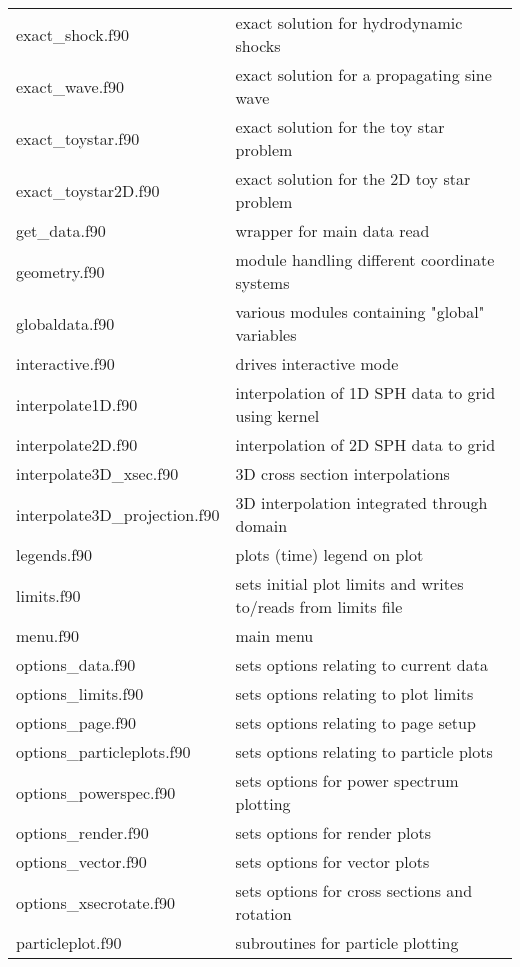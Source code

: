 \documentclass[a4paper,11pt]{article}
\begin{document}
\begin{longtable}{|lp{}|}
     exact\_shock.f90        & exact solution for hydrodynamic shocks\\
     exact\_wave.f90         & exact solution for a propagating sine wave\\
     exact\_toystar.f90      & exact solution for the toy star problem\\
     exact\_toystar2D.f90    & exact solution for the 2D toy star problem\\
     get\_data.f90           & wrapper for main data read\\
     geometry.f90           & module handling different coordinate systems\\
     globaldata.f90         & various modules containing "global" variables\\
     interactive.f90        & drives interactive mode\\
     interpolate1D.f90	 & interpolation of 1D SPH data to grid using kernel\\
     interpolate2D.f90	 & interpolation of 2D SPH data to grid     \\
     interpolate3D\_xsec.f90 & 3D cross section interpolations\\
     interpolate3D\_projection.f90	 & 3D interpolation integrated through domain\\
     legends.f90		       & plots (time) legend on plot\\
     limits.f90                   & sets initial plot limits and writes to/reads from limits file\\
     menu.f90               & main menu\\
     options\_data.f90       & sets options relating to current data\\
     options\_limits.f90     & sets options relating to plot limits\\
     options\_page.f90       & sets options relating to page setup\\
     options\_particleplots.f90 & sets options relating to particle plots\\
     options\_powerspec.f90  & sets options for power spectrum plotting\\
     options\_render.f90	 & sets options for render plots\\
     options\_vector.f90	 & sets options for vector plots\\
     options\_xsecrotate.f90 & sets options for cross sections and rotation\\
     particleplot.f90       & subroutines for particle plotting\\

\end{longtable}
\end{document}

